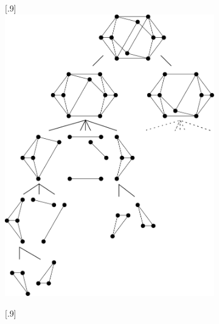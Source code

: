 \begin{figure}\centering%
    \begin{subfigure}{0.5\linewidth}\centering
        \scalebox{1}[.9]{
        \includegraphics[height=\myMinHeight]{../../img/svg/new_overconstrained_optimal}
        }
        \caption{}\label{fig:overconstrained:optimal}
    \end{subfigure}%
    \hfill
    \begin{subfigure}{0.5\linewidth}\centering
        \scalebox{1}[.9]{
}
\end{subfigure}
\end{figure}
